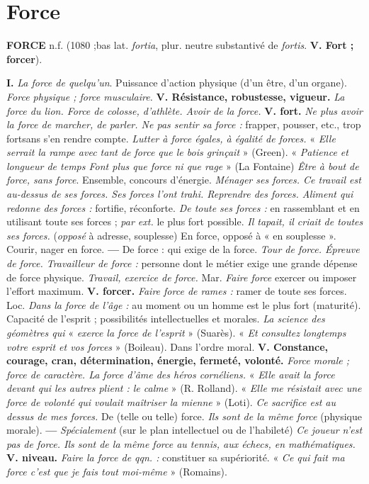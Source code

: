 \section{Force}
{\bf FORCE} {\sf n.f.} (1080 ;bas lat. {\it fortia}, plur. neutre substantivé de {\it fortis}. {\bf V. Fort ; forcer}).

{\bf I.} {\it La force de quelqu'un}.  Puissance d'action physique (d'un être, d'un organe). {\it Force physique ; force musculaire.} {\bf V. Résistance, robustesse, vigueur.} {\it La force du lion. Force de colosse, d'athlète. Avoir de la force.} {\bf V. fort.} {\it Ne plus avoir la force de marcher, de parler. Ne pas sentir sa force :} frapper, pousser, etc., trop fortsans s'en rendre compte. {\it Lutter à force égales, à égalité de forces.} « {\it Elle serrait la rampe avec tant de force que le bois grinçait} » ({\sc Green}). « {\it Patience et longueur de temps Font plus que force ni que rage} » ({\sc La Fontaine}) {\it Être à bout de force, sans force}.  Ensemble, concours d'énergie. {\it Ménager ses forces. Ce travail est au-dessus de ses forces. Ses forces l'ont trahi. Reprendre des forces. Aliment qui redonne des forces :} fortifie, réconforte. {\it De toute ses forces :} en rassemblant et en utilisant toute ses forces ; {\it par ext.} le plus fort possible. {\it Il tapait, il criait de toutes ses forces.} \lb ({\it opposé} à adresse, souplesse) {\sc En force}, opposé à « en souplesse ». Courir, nager en force. {\bf —} {\sc De force} : qui exige de la force. {\it Tour de force. Épreuve de force. Travailleur de force :} personne dont le métier exige une grande dépense de force physique. {\it Travail, exercice de force.} \lb Mar. {\it Faire force} exercer ou imposer l'effort maximum. {\bf V. forcer.} {\it Faire force de rames :} ramer de toute ses forces. \lb Loc. {\it Dans la force de l'âge :} au moment ou un homme est le plus fort (maturité).  Capacité de l'esprit ; possibilités intellectuelles et morales. {\it La science des géomètres qui } « {\it exerce la force de l'esprit} » ({\sc Suarès}). « {\it Et consultez longtemps votre esprit et vos forces} » ({\sc Boileau}). Dans l'ordre moral. {\bf V. Constance, courage, cran, détermination, énergie, fermeté, volonté.} {\it Force morale ; force de caractère. La force d'âme des héros cornéliens.} « {\it Elle avait la force devant qui les autres plient : le calme} » ({\sc R. Rolland}). « {\it Elle me résistait avec une force de volonté qui voulait maîtriser la mienne} » ({\sc Loti}). {\it Ce sacrifice est au dessus de mes forces.}   {\sc De} (telle ou telle) {\sc force.} {\it Ils sont de la même force} (physique morale). {\bf —} {\it Spécialement} (sur le plan intellectuel ou de l'habileté) {\it Ce joueur n'est pas de force. Ils sont de la même force au tennis, aux échecs, en mathématiques.} {\bf V. niveau.}  {\it Faire la force de qqn. :} constituer sa supériorité. « {\it Ce qui fait ma force c'est que je fais tout moi-même} » ({\sc Romains}).

